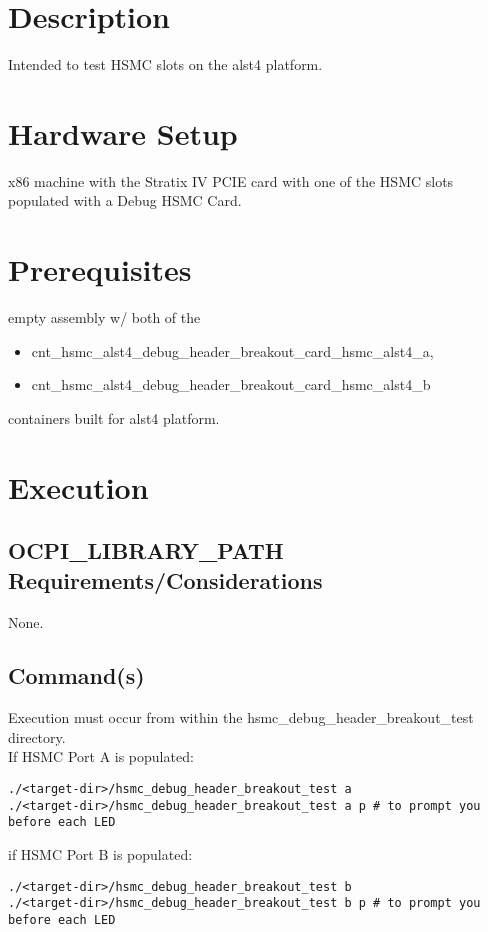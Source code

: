 \section{Description}
Intended to test HSMC slots on the alst4 platform.
\section{Hardware Setup}
x86 machine with the Stratix IV PCIE card with one of the HSMC slots populated with a Debug HSMC Card\cite{debugcard}.
\section{Prerequisites}
empty assembly w/ both of the
\begin{itemize}
  \item cnt\_hsmc\_alst4\_debug\_header\_breakout\_card\_hsmc\_alst4\_a,
  \item cnt\_hsmc\_alst4\_debug\_header\_breakout\_card\_hsmc\_alst4\_b
\end{itemize}
containers built for alst4 platform.
\section{Execution}
\subsection{OCPI\_LIBRARY\_PATH Requirements/Considerations}
None.
\subsection{Command(s)}
Execution must occur from within the hsmc\_debug\_header\_breakout\_test directory. \\
If HSMC Port A is populated:
\begin{lstlisting}
./<target-dir>/hsmc_debug_header_breakout_test a
./<target-dir>/hsmc_debug_header_breakout_test a p # to prompt you before each LED
\end{lstlisting}
if HSMC Port B is populated:
\begin{lstlisting}
./<target-dir>/hsmc_debug_header_breakout_test b
./<target-dir>/hsmc_debug_header_breakout_test b p # to prompt you before each LED
\end{lstlisting}
